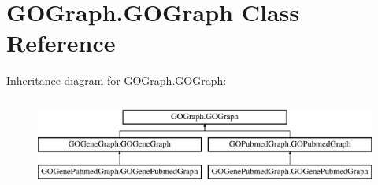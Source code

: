 \hypertarget{class_g_o_graph_1_1_g_o_graph}{
\section{GOGraph.GOGraph Class Reference}
\label{class_g_o_graph_1_1_g_o_graph}
}
Inheritance diagram for GOGraph.GOGraph:\begin{figure}[H]
\begin{center}
\leavevmode
\includegraphics[height=2.978723cm]{class_g_o_graph_1_1_g_o_graph}
\end{center}
\end{figure}
